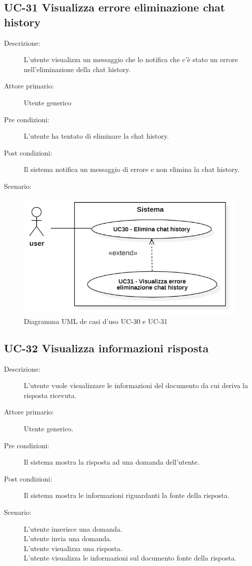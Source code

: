 \subsection{UC-31 Visualizza errore eliminazione chat history }
\begin{description}
    \item[Descrizione:] L'utente visualizza un messaggio che lo notifica che c'è stato un errore nell'eliminazione della chat history.
    \item[Attore primario:] Utente generico
    \item[Pre condizioni:] L'utente ha tentato di eliminare la chat history.
    \item[Post condizioni:] Il sistema notifica un messaggio di errore e non elimina la chat history.
    \item[Scenario:] 
\end{description}

\begin{figure}[H]
    \centering
    \includegraphics[width=0.9\linewidth]{UC30-31.PNG}
    \caption{Diagramma UML de casi d'uso UC-30 e UC-31}
    \label{fig:UC30-31}
\end{figure}

\subsection{UC-32 Visualizza informazioni risposta}
\begin{description}
    \item[Descrizione:] L'utente vuole visualizzare le informazioni del documento da cui deriva la risposta ricevuta.
    \item[Attore primario:] Utente generico.
    \item[Pre condizioni:] Il sistema mostra la risposta ad una domanda dell'utente.
    \item[Post condizioni:] Il sistema mostra le informazioni riguardanti la fonte della risposta.
    \item[Scenario:] L'utente inserisce una domanda.\\L'utente invia una domanda.\\L'utente visualizza una risposta.\\L'utente visualizza le informazioni sul documento fonte della risposta.
\end{description}

